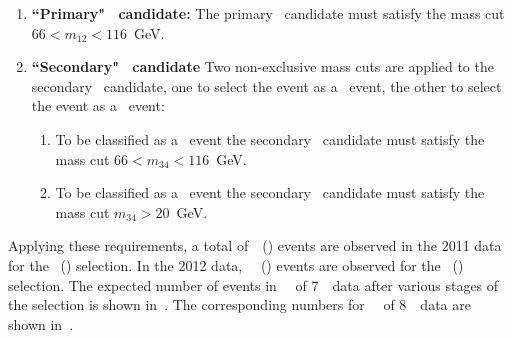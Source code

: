 \begin{enumerate}
    \item {\bf ``Primary" \Z\ candidate:} The primary \Z\ candidate must satisfy the mass cut $66<m_{12}<116$~GeV.

    \item {\bf ``Secondary" \Z\ candidate} Two non-exclusive mass cuts are
    applied to the secondary \Z\ candidate, one
    to select the event as a \ZZ\ event, the other to select the event as a
    \ZZs\ event:
      \begin{enumerate}
     \item To be classified as a \ZZ\ event the secondary \Z\ candidate must satisfy
     the mass cut $66<m_{34}<116$~GeV.
     \item To be classified as a \ZZs\ event the secondary \Z\ candidate
     must satisfy the mass cut $m_{34}>20$~GeV.
    \end{enumerate}

\end{enumerate}

Applying these requirements, a total
of~\ZZSevenTeVNSigEventsObsZZLLLL\ (\ZZSevenTeVNSigEventsObsZZsLLLL) events
are observed in the 2011 data for the \ZZ\ (\ZZs) selection. In the 2012 data, 
~\ZZEightTeVNSigEventsObsZZLLLL\ (\ZZEightTeVNSigEventsObsZZsLLLL) events are
observed for the \ZZ\ (\ZZs) selection. The expected number of events in
\LumiPassGRLTwentyEleven\ \ifb\ of 7~\tev\ data after various stages of the
selection is shown in~. The corresponding numbers for
\LumiPassGRLTwentyTwelve\ \ifb\ of 8~\tev\ data are shown
in~.

